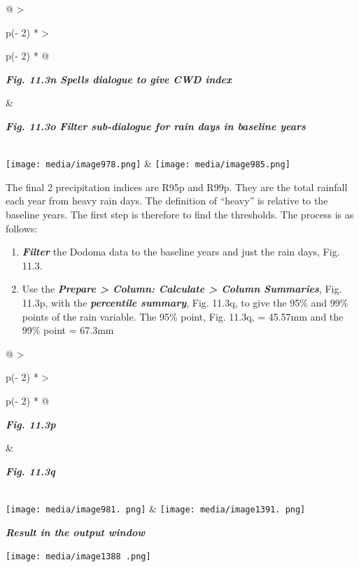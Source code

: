 \documentclass[
  letterpaper,
  DIV=11,
  numbers=noendperiod]{scrreprt}
\begin{document}
\begin{longtable}[]{@{}
  >{\raggedright\arraybackslash}p{(\columnwidth - 2\tabcolsep) * }
  >{\raggedright\arraybackslash}p{(\columnwidth - 2\tabcolsep) * }@{}}
\toprule\noalign{}
\begin{minipage}[b]{\linewidth}\raggedright
\textbf{\emph{Fig. 11.3n Spells dialogue to give CWD index}}
\end{minipage} & \begin{minipage}[b]{\linewidth}\raggedright
\textbf{\emph{Fig. 11.3o Filter sub-dialogue for rain days in baseline
years}}
\end{minipage} \\
\midrule\noalign{}
\endhead
\bottomrule\noalign{}
\endlastfoot
\texttt{[image: media/image978.png]} &
\texttt{[image: media/image985.png]} \\
\end{longtable}

The final 2 precipitation indices are R95p and R99p. They are the total
rainfall each year from heavy rain days. The definition of ``heavy'' is
relative to the baseline years. The first step is therefore to find the
thresholds. The process is as follows:

\begin{enumerate}
\def\labelenumi{\arabic{enumi}.}
\item
  \textbf{\emph{Filter}} the Dodoma data to the baseline years and just
  the rain days, Fig. 11.3.
\item
  Use the \textbf{\emph{Prepare \textgreater{} Column: Calculate
  \textgreater{} Column Summaries}}, Fig. 11.3p, with the
  \textbf{\emph{percentile summary}}, Fig. 11.3q, to give the 95\% and
  99\% points of the rain variable. The 95\% point, Fig. 11.3q, =
  45.57mm and the 99\% point = 67.3mm
\end{enumerate}

\begin{longtable}[]{@{}
  >{\raggedright\arraybackslash}p{(\columnwidth - 2\tabcolsep) * }
  >{\raggedright\arraybackslash}p{(\columnwidth - 2\tabcolsep) * }@{}}
\toprule\noalign{}
\begin{minipage}[b]{\linewidth}\raggedright
\textbf{\emph{Fig. 11.3p}}
\end{minipage} & \begin{minipage}[b]{\linewidth}\raggedright
\textbf{\emph{Fig. 11.3q}}
\end{minipage} \\
\midrule\noalign{}
\endhead
\bottomrule\noalign{}
\endlastfoot
\texttt{[image: media/image981. png]} &
\texttt{[image: media/image1391. png]}

\textbf{\emph{Result in the output window}}

\texttt{[image: media/image1388 .png]} \\
\end{longtable}
\end{document}
